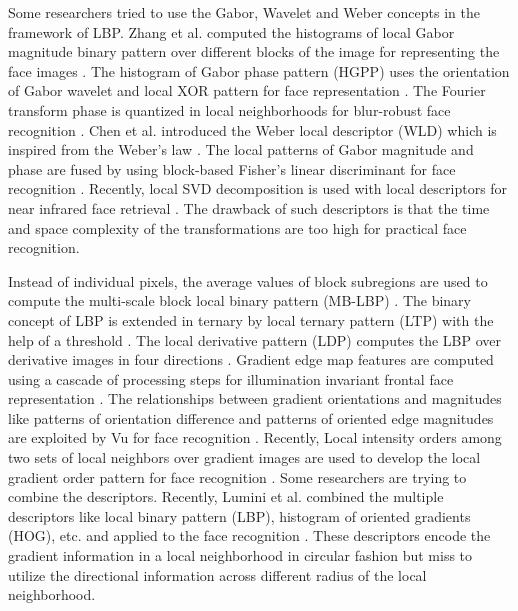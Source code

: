 \documentclass[a4paper]{article}
\begin{document}
Some researchers tried to use the Gabor, Wavelet and Weber concepts in the framework of LBP. Zhang et al. computed the histograms of local Gabor magnitude binary pattern over different blocks of the image for representing the face images \cite{lgbphs}. The  histogram of Gabor phase pattern (HGPP) uses the orientation of Gabor wavelet and local XOR pattern for face representation \cite{hgpp}. The Fourier transform phase is quantized in local neighborhoods for blur-robust face recognition \cite{ahonen2008}. Chen et al. introduced the Weber local descriptor (WLD) which is inspired from the Weber's law \cite{wld}. The local patterns of Gabor magnitude and phase are fused by using block-based Fisher's linear discriminant for face recognition \cite{xie2010fusing}. Recently, local SVD decomposition is used with local descriptors for near infrared face retrieval \cite{svdslbp}. The drawback of such descriptors is that the time and space complexity of the transformations are too high for practical face recognition.

Instead of individual pixels, the average values of block subregions are used to compute the multi-scale block local binary pattern (MB-LBP) \cite{mblbp}. The binary concept of LBP is extended in ternary by local ternary pattern (LTP) with the help of a threshold \cite{ltp}. The local derivative pattern (LDP) computes the LBP over derivative images in four directions \cite{ldp}. Gradient edge map features are computed using a cascade of processing steps for illumination invariant frontal face representation \cite{gemf}. The relationships between gradient orientations and magnitudes like patterns of orientation difference and patterns of oriented edge magnitudes are exploited by Vu for face recognition \cite{vu2013}. Recently, Local intensity orders among two sets of local neighbors over gradient images are used to develop the local gradient order pattern for face recognition \cite{lgop}. Some researchers are trying to combine the descriptors. Recently, Lumini et al. combined the multiple descriptors like local binary pattern (LBP), histogram of oriented gradients (HOG), etc. and applied to the face recognition \cite{lumini2017}. These descriptors encode the gradient information in a local neighborhood in circular fashion but miss to utilize the directional information across different radius of the local neighborhood.
\end{document}
